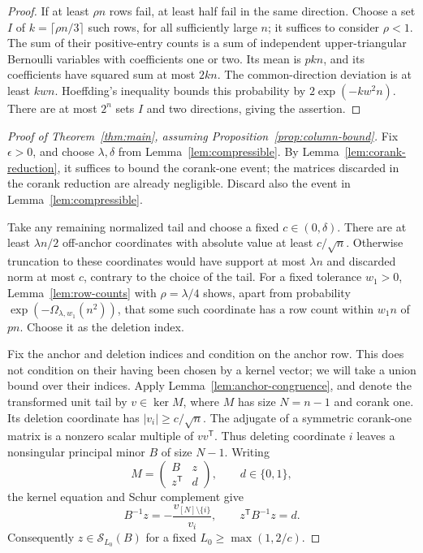 \begin{proof}
If at least \(\rho n\) rows fail, at least half fail in the same
direction. Choose a set \(I\) of \(k=\lceil\rho n/3\rceil\)
such rows, for all sufficiently large \(n\); it suffices to
consider \(\rho<1\).
The sum of their positive-entry counts is a sum of independent
upper-triangular Bernoulli variables with coefficients one or
two. Its mean is \(pkn\), and its coefficients have squared
sum at most \(2kn\). The common-direction deviation is at
least \(kwn\). Hoeffding's inequality
\cite[Theorem~2]{Hoeffding} bounds this probability by
 \(2\exp(-kw^2n)\).
There are at most \(2^n\) sets \(I\) and two directions, giving
the assertion.
\end{proof}

\begin{proof}[Proof of Theorem~\ref{thm:main}, assuming
Proposition~\ref{prop:column-bound}]
Fix \(\epsilon>0\), and choose \(\lambda,\delta\) from
Lemma~\ref{lem:compressible}. By
Lemma~\ref{lem:corank-reduction}, it suffices to bound the
corank-one event; the matrices discarded in the corank reduction
are already negligible. Discard also the event in
Lemma~\ref{lem:compressible}.

Take any remaining normalized tail and choose a fixed
\(c\in(0,\delta)\). There are at least \(\lambda n/2\)
off-anchor coordinates with absolute value at least
\(c/\sqrt n\). Otherwise truncation to these coordinates
would have support at most \(\lambda n\) and discarded norm
at most \(c\), contrary to the choice of the tail.
For a fixed tolerance \(w_1>0\), Lemma~\ref{lem:row-counts}
with \(\rho=\lambda/4\) shows, apart from probability
\(\exp(-\Omega_{\lambda,w_1}(n^2))\), that some such coordinate
has a row count within \(w_1n\) of \(pn\).
Choose it as the deletion index.

Fix the anchor and deletion indices and condition on the anchor
row. This does not condition on their having been chosen by a
kernel vector; we will take a union bound over their indices.
Apply Lemma~\ref{lem:anchor-congruence}, and denote the transformed
unit tail by \(v\in\ker M\), where \(M\) has size \(N=n-1\)
and corank one. Its deletion coordinate has
\(|v_i|\ge c/\sqrt n\).
The adjugate of a symmetric corank-one matrix is a nonzero
scalar multiple of \(vv^{\mathsf T}\). Thus deleting coordinate
\(i\) leaves a nonsingular principal minor \(B\) of size \(N-1\).
Writing
\[
 M=\begin{pmatrix}B&z\\z^{\mathsf T}&d\end{pmatrix},
 \qquad d\in\{0,1\},
\]
the kernel equation and Schur complement give
\[
 B^{-1}z=-\frac{v_{[N]\setminus\{i\}}}{v_i},
 \qquad z^{\mathsf T}B^{-1}z=d.
\]
Consequently \(z\in\mathcal S_{L_0}(B)\) for a fixed
\(L_0\ge\max(1,2/c)\).


\end{proof}
